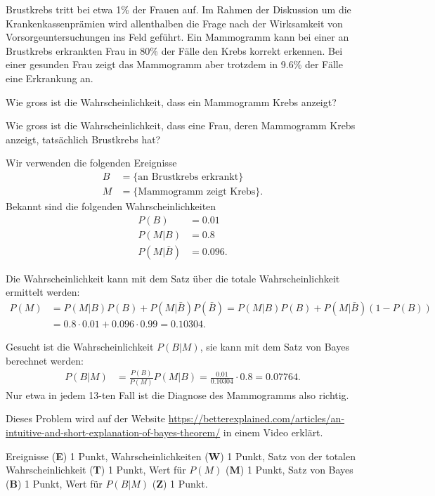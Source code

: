 Brustkrebs tritt bei etwa 1\% der Frauen auf.
Im Rahmen der Diskussion um die Krankenkassenprämien wird allenthalben
die Frage nach der Wirksamkeit von Vorsorgeuntersuchungen ins Feld 
geführt.
Ein Mammogramm kann bei einer an Brustkrebs erkrankten Frau in 80\% der
Fälle den Krebs korrekt erkennen.
Bei einer gesunden Frau zeigt das Mammogramm aber trotzdem in 9.6\% der Fälle
eine Erkrankung an.

\begin{teilaufgaben}
\item
Wie gross ist die Wahrscheinlichkeit, dass ein Mammogramm Krebs anzeigt?
\item
Wie gross ist die Wahrscheinlichkeit, dass eine Frau, deren Mammogramm
Krebs anzeigt, tatsächlich Brustkrebs hat?
\end{teilaufgaben}

\begin{loesung}
Wir verwenden die folgenden Ereignisse
\begin{align*}
B&=\{\text{an Brustkrebs erkrankt}\}
\\
M&=\{\text{Mammogramm zeigt Krebs}\}.
\end{align*}
Bekannt sind die folgenden Wahrscheinlichkeiten
\begin{align*}
P(B)&=0.01\\
P(M|B)&=0.8\\
P(M|\bar{B})&=0.096.
\end{align*}
\begin{teilaufgaben}
\item
Die Wahrscheinlichkeit kann mit dem Satz über die totale Wahrscheinlichkeit
ermittelt werden:
\begin{align*}
P(M)
&=
P(M|B) P(B) + P(M|\bar{B}) P(\bar{B})
=
P(M|B) P(B) + P(M|\bar{B}) (1-P(B))
\\
&=
0.8\cdot 0.01 + 0.096\cdot 0.99
=
0.10304.
\end{align*}
\item
Gesucht ist die Wahrscheinlichkeit $P(B|M)$, sie kann mit dem Satz von
Bayes berechnet werden:
\begin{align*}
P(B|M)
&=
\frac{P(B)}{P(M)} P(M|B)
=
\frac{0.01}{0.10304}\cdot 0.8
=
0.07764.
\end{align*}
Nur etwa in jedem 13-ten Fall ist die Diagnose des Mammogramms also richtig.
\qedhere
\end{teilaufgaben}
\end{loesung}

\begin{diskussion}
Dieses Problem wird auf der Website
\url{https://betterexplained.com/articles/an-intuitive-and-short-explanation-of-bayes-theorem/}
in einem Video erklärt.
\end{diskussion}

\begin{bewertung}
Ereignisse ({\bf E}) 1 Punkt,
Wahrscheinlichkeiten ({\bf W}) 1 Punkt,
Satz von der totalen Wahrscheinlichkeit ({\bf T}) 1 Punkt,
Wert für $P(M)$ ({\bf M}) 1 Punkt,
Satz von Bayes ({\bf B}) 1 Punkt,
Wert für $P(B|M)$ ({\bf Z}) 1 Punkt.
\end{bewertung}
